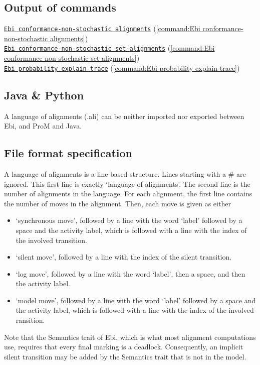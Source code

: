 {\subsection*{Output of commands} \null\qquad\hyperref[command:Ebi conformance-non-stochastic alignments]{\texttt{Ebi conformance-non-stochastic alignments}} (\cref{command:Ebi conformance-non-stochastic alignments})\\\null\qquad\hyperref[command:Ebi conformance-non-stochastic set-alignments]{\texttt{Ebi conformance-non-stochastic set-alignments}} (\cref{command:Ebi conformance-non-stochastic set-alignments})\\\null\qquad\hyperref[command:Ebi probability explain-trace]{\texttt{Ebi probability explain-trace}} (\cref{command:Ebi probability explain-trace})
\subsection*{Java \& Python}
A language of alignments (.ali) can be neither imported nor exported between Ebi, and ProM and Java.
\subsection*{File format specification}A language of alignments is a line-based structure. Lines starting with a \# are ignored.
    This first line is exactly `language of alignments'.
    The second line is the number of alignments in the language.
    For each alignment, the first line contains the number of moves in the alignment.
    Then, each move is given as either 
    \begin{itemize}
        \item `synchronous move', followed by a line with the word `label' followed by a space and the activity label, which is followed with a line with the index of the involved transition.
        \item `silent move', followed by a line with the index of the silent transition.
        \item `log move', followed by a line with the word `label', then a space, and then the activity label.
        \item `model move', followed by a line with the word `label' followed by a space and the activity label, which is followed with a line with the index of the involved ransition.
    \end{itemize}
    Note that the Semantics trait of Ebi, which is what most alignment computations use, requires that every final marking is a deadlock.
    Consequently, an implicit silent transition may be added by the Semantics trait that is not in the model.
    
}
